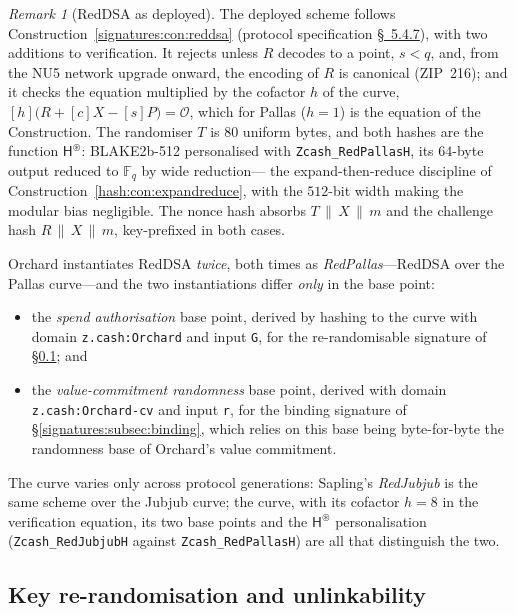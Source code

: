 \documentclass[11pt,a4paper]{article}
\theoremstyle{definition}
\theoremstyle{remark}
\newtheorem{remark}[theorem]{Remark}
\newcommand{\Fq}{\ensuremath{\mathbb{F}_{q}}}
\begin{document}
\begin{remark}[RedDSA as deployed]\label{signatures:rem:redpallas}
The deployed scheme follows Construction~\ref{signatures:con:reddsa}
(protocol specification
\href{https://zips.z.cash/protocol/protocol.pdf\#concretereddsa}{\S~5.4.7}),
with two additions to verification. It rejects unless \(R\) decodes to a point,
\(s < q\), and, from the NU5 network upgrade onward, the encoding of
\(R\) is canonical (ZIP~216); and it checks the equation multiplied
by the cofactor \(h\) of the curve,
\([h]\bigl(R + [c]X - [s]P\bigr) = \mathcal{O}\), which for Pallas
(\(h = 1\)) is the equation of the Construction. The randomiser
\(T\) is \(80\) uniform bytes, and both hashes are the function
\(\mathsf{H}^{\circledast}\): BLAKE2b-512 personalised with
\texttt{Zcash\_RedPallasH}, its \(64\)-byte output reduced to
\(\Fq\) by wide reduction---
the expand-then-reduce discipline of
Construction~\ref{hash:con:expandreduce}, with the \(512\)-bit width
making the modular bias negligible. The nonce hash absorbs
\(T \,\|\, X \,\|\, m\) and the challenge hash
\(R \,\|\, X \,\|\, m\), key-prefixed in both cases.

Orchard instantiates RedDSA \emph{twice}, both times as
\emph{RedPallas}---RedDSA over the Pallas curve---and the two
instantiations differ \emph{only} in the base point:
\begin{itemize}
\item the \emph{spend authorisation} base point, derived by hashing
  to the curve with domain \texttt{z.cash:\allowbreak Orchard} and input
  \texttt{G}, for the re-randomisable signature of
  \S\ref{signatures:subsec:rerand}; and
\item the \emph{value-commitment randomness} base point, derived
  with domain \texttt{z.cash:Orchard-cv} and input \texttt{r}, for
  the binding signature of \S\ref{signatures:subsec:binding}, which
  relies on this base being byte-for-byte the randomness base of
  Orchard's value commitment.
\end{itemize}
The curve varies only across protocol generations: Sapling's
\emph{RedJubjub} is the same scheme over the Jubjub curve;
the curve, with its cofactor \(h = 8\) in the verification
equation, its two base points and the \(\mathsf{H}^{\circledast}\)
personalisation (\texttt{Zcash\_RedJubjubH} against
\texttt{Zcash\_RedPallasH}) are all that distinguish the two.
\end{remark}

\subsection{Key re-randomisation and unlinkability}
\label{signatures:subsec:rerand}
\end{document}
